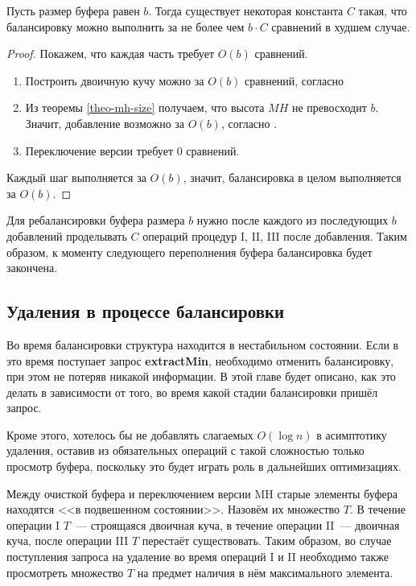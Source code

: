 \begin{theorem}\label{theo-balancing-constant}
Пусть размер буфера равен $b$. Тогда существует некоторая константа $C$ такая,
что балансировку можно выполнить за не более чем $b\cdot C$ сравнений в худшем случае.
\end{theorem}
\begin{proof}
Покажем, что каждая часть требует $O(b)$ сравнений.
\begin{enumerate}[label=\Roman*.]
\item Построить двоичную кучу можно за $O(b)$ сравнений, согласно 
\item Из теоремы \ref{theo-mh-size} получаем, что высота $MH$ не превосходит $b$. Значит,
добавление возможно за $O(b)$, согласно .
\item Переключение версии требует 0 сравнений.
\end{enumerate}
Каждый шаг выполняется за $O(b)$, значит, балансировка в целом выполняется за $O(b)$.
\end{proof}

Для ребалансировки буфера размера $b$ нужно после каждого из последующих $b$
добавлений проделывать $C$ операций процедур I, II, III после добавления.
Таким образом, к моменту следующего переполнения буфера балансировка будет закончена.

\subsection{Удаления в процессе балансировки}

Во время балансировки структура находится в нестабильном состоянии. Если
в это время поступает запрос \textbf{extractMin}, необходимо отменить балансировку,
при этом не потеряв никакой информации. В этой главе будет описано, как это делать
в зависимости от того, во время какой стадии балансировки пришёл запрос.

Кроме этого, хотелось бы не добавлять слагаемых $O(\log n)$ в асимптотику удаления,
оставив из обязательных операций с такой сложностью только просмотр буфера,
поскольку это будет играть роль в дальнейших оптимизациях.

Между очисткой буфера и переключением версии MH старые элементы буфера находятся
<<в подвешенном состоянии>>. Назовём их множество $T$. В течение операции I $T$~---
строящаяся двоичная куча, в течение операции II~--- двоичная куча, после операции III
$T$ перестаёт существовать. Таким образом, во случае поступления запроса на удаление
во время операций I и II необходимо также просмотреть множество $T$ на предмет
наличия в нём максимального элемента.

